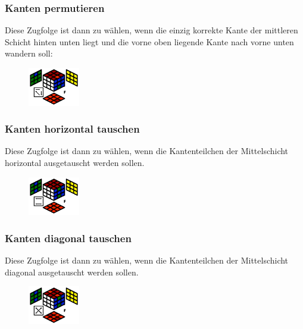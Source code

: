 \documentclass[letterpaper,10pt,twoside,twocolumn,openany]{book}
\begin{document}
\subsubsection{Kanten permutieren}
\begin{justify}
Diese Zugfolge ist dann zu wählen, wenn die einzig korrekte Kante der mittleren Schicht hinten unten liegt und die vorne oben liegende Kante nach vorne unten wandern soll:
\end{justify}
\begin{figure}[!htb] 
  \centering
     \includegraphics[width=0.20\textwidth]{img/middle-permutate.png}
\end{figure}

\subsubsection{Kanten horizontal tauschen}
\begin{justify}
Diese Zugfolge ist dann zu wählen, wenn die Kantenteilchen der Mittelschicht horizontal ausgetauscht werden sollen.  
\end{justify}
\begin{figure}[!htb] 
  \centering
     \includegraphics[width=0.20\textwidth]{img/middle-translate.png}
\end{figure}

\subsubsection{Kanten diagonal tauschen}
\begin{justify}
Diese Zugfolge ist dann zu wählen, wenn die Kantenteilchen der Mittelschicht diagonal ausgetauscht werden sollen.
\end{justify}
\begin{figure}[!htb] 
  \centering
     \includegraphics[width=0.20\textwidth]{img/middle-crossover.png}
\end{figure}
\end{document}

